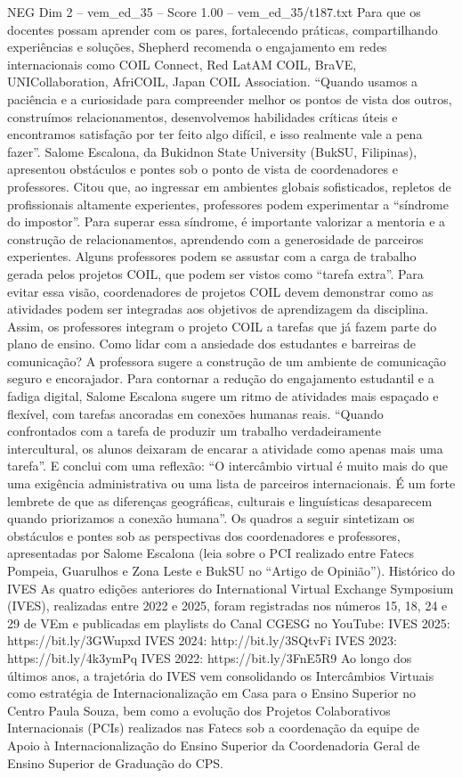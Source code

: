 \begin{textsample}{NEG Dim 2 – vem\_ed\_35 – Score 1.00 – vem\_ed\_35/t187.txt}
Para que os docentes possam aprender com os pares, fortalecendo práticas, compartilhando experiências e soluções, Shepherd recomenda o engajamento em redes internacionais como COIL Connect, Red LatAM COIL, BraVE, UNICollaboration, AfriCOIL, Japan COIL Association. “Quando usamos a paciência e a curiosidade para compreender melhor os pontos de vista dos outros, construímos relacionamentos, desenvolvemos habilidades críticas úteis e encontramos satisfação por ter feito algo difícil, e isso realmente vale a pena fazer”.
Salome Escalona, da Bukidnon State University (BukSU, Filipinas), apresentou obstáculos e pontes sob o ponto de vista de coordenadores e professores.
Citou que, ao ingressar em ambientes globais sofisticados, repletos de profissionais altamente experientes, professores podem experimentar a “síndrome do impostor”.
Para superar essa síndrome, é importante valorizar a mentoria e a construção de relacionamentos, aprendendo com a generosidade de parceiros experientes.
Alguns professores podem se assustar com a carga de trabalho gerada pelos projetos COIL, que podem ser vistos como “tarefa extra”.
Para evitar essa visão, coordenadores de projetos COIL devem demonstrar como as atividades podem ser integradas aos objetivos de aprendizagem da disciplina.
Assim, os professores integram o projeto COIL a tarefas que já fazem parte do plano de ensino.
Como lidar com a ansiedade dos estudantes e barreiras de comunicação?
A professora sugere a construção de um ambiente de comunicação seguro e encorajador.
Para contornar a redução do engajamento estudantil e a fadiga digital, Salome Escalona sugere um ritmo de atividades mais espaçado e flexível, com tarefas ancoradas em conexões humanas reais. “Quando confrontados com a tarefa de produzir um trabalho verdadeiramente intercultural, os alunos deixaram de encarar a atividade como apenas mais uma tarefa”.
E conclui com uma reflexão: “O intercâmbio virtual é muito mais do que uma exigência administrativa ou uma lista de parceiros internacionais.
É um forte lembrete de que as diferenças geográficas, culturais e linguísticas desaparecem quando priorizamos a conexão humana”.
Os quadros a seguir sintetizam os obstáculos e pontes sob as perspectivas dos coordenadores e professores, apresentadas por Salome Escalona (leia sobre o PCI realizado entre Fatecs Pompeia, Guarulhos e Zona Leste e BukSU no “Artigo de Opinião”).
Histórico do IVES As quatro edições anteriores do International Virtual Exchange Symposium (IVES), realizadas entre 2022 e 2025, foram registradas nos números 15, 18, 24 e 29 de VEm e publicadas em playlists do Canal CGESG no YouTube: IVES 2025: https://bit.ly/3GWupxd IVES 2024: http://bit.ly/3SQtvFi IVES 2023: https://bit.ly/4k3ymPq IVES 2022: https://bit.ly/3FnE5R9 Ao longo dos últimos anos, a trajetória do IVES vem consolidando os Intercâmbios Virtuais como estratégia de Internacionalização em Casa para o Ensino Superior no Centro Paula Souza, bem como a evolução dos Projetos Colaborativos Internacionais (PCIs) realizados nas Fatecs sob a coordenação da equipe de Apoio à Internacionalização do Ensino Superior da Coordenadoria Geral de Ensino Superior de Graduação do CPS.

\end{textsample}
